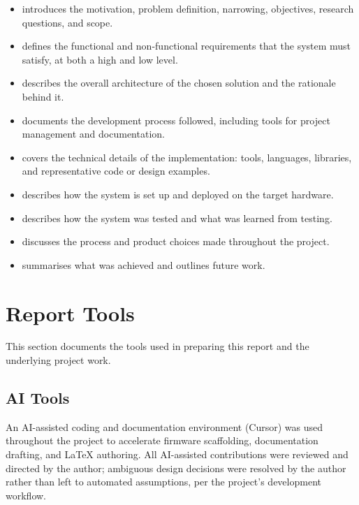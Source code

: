 \begin{itemize}
    \item {} introduces the motivation, problem
        definition, narrowing, objectives, research questions, and scope.
    \item {} defines the functional and
        non-functional requirements that the system must satisfy, at both
        a high and low level.
    \item {} describes the overall architecture
        of the chosen solution and the rationale behind it.
    \item {} documents the development process
        followed, including tools for project management and
        documentation.
    \item {} covers the technical details of the
        implementation: tools, languages, libraries, and representative
        code or design examples.
    \item {} describes how the system is set up and
        deployed on the target hardware.
    \item {} describes how the system was tested
        and what was learned from testing.
    \item {} discusses the process and product choices
        made throughout the project.
    \item {} summarises what was achieved and outlines
        future work.
\end{itemize}

\section{Report Tools}
\label{sec:report-tools}

This section documents the tools used in preparing this report and the
underlying project work.

\subsection{AI Tools}

An AI-assisted coding and documentation environment (Cursor) was used
throughout the project to accelerate firmware scaffolding, documentation
drafting, and LaTeX authoring. All AI-assisted contributions were
reviewed and directed by the author; ambiguous design decisions were
resolved by the author rather than left to automated assumptions, per the
project's development workflow.

